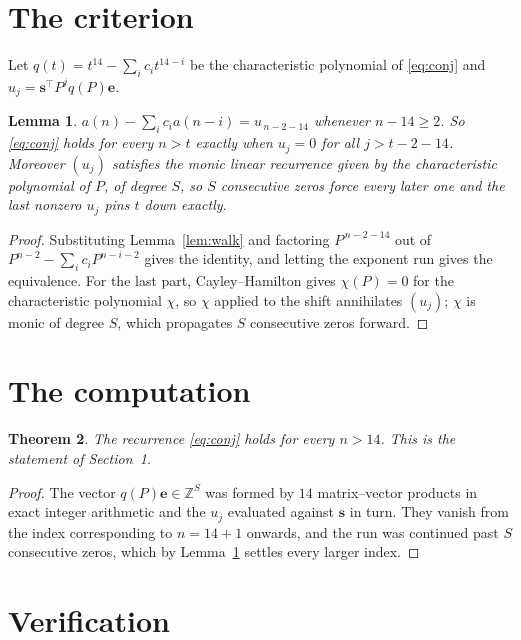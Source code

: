 \documentclass[11pt,a4paper]{article}
\theoremstyle{plain}
\newtheorem{theorem}{Theorem}
\newtheorem{lemma}[theorem]{Lemma}
\theoremstyle{definition}
\begin{document}
\section{The criterion}

Let $q(t)=t^{14}-\sum_i c_i t^{14-i}$ be the characteristic polynomial of
\eqref{eq:conj} and $u_j=\mathbf{s}^{\!\top}P^{j}q(P)\mathbf{e}$.

\begin{lemma}\label{lem:crit}
$a(n)-\sum_i c_i a(n-i)=u_{\,n-2-14}$ whenever $n-14\ge2$. So \eqref{eq:conj}
holds for every $n>t$ exactly when $u_j=0$ for all $j>t-2-14$. Moreover $(u_j)$
satisfies the monic linear recurrence given by the characteristic polynomial of $P$, of
degree $S$, so $S$ consecutive zeros force every later one and the last nonzero $u_j$ pins
$t$ down exactly.
\end{lemma}

\begin{proof}
Substituting Lemma~\ref{lem:walk} and factoring $P^{\,n-2-14}$ out of
$P^{n-2}-\sum_i c_i P^{n-i-2}$ gives the identity, and letting the exponent run gives the
equivalence. For the last part, Cayley--Hamilton gives $\chi(P)=0$ for the characteristic
polynomial $\chi$, so $\chi$ applied to the shift annihilates $(u_j)$; $\chi$ is monic of
degree $S$, which propagates $S$ consecutive zeros forward.
\end{proof}

\section{The computation}

\begin{theorem}
The recurrence \eqref{eq:conj} holds for every $n>14$. This is the statement of
Section~1.
\end{theorem}

\begin{proof}
The vector $q(P)\mathbf{e}\in\mathbb{Z}^{S}$ was formed by $14$ matrix--vector
products in exact integer arithmetic and the $u_j$ evaluated against $\mathbf{s}$ in turn.
They vanish from the index corresponding to $n=14+1$ onwards, and the run was continued
past $S$ consecutive zeros, which by Lemma~\ref{lem:crit} settles every larger index.
\end{proof}

\section{Verification}
\end{document}
